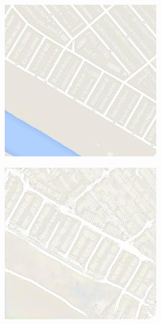 \begin{figure}
  \begin{subfigure}[t]{.14\textwidth}
    \centering
    \includegraphics[width=\linewidth]{images/cycleGanResults/Maps6_Or_Ld120_E100_Lr0002.jpg}
  \end{subfigure}
  \begin{subfigure}[t]{.14\textwidth}
    \centering
    \includegraphics[width=\linewidth]{images/cycleGanResults/Maps6Ld120_E100_Lr0002.jpg}

\end{subfigure}
\end{figure}
